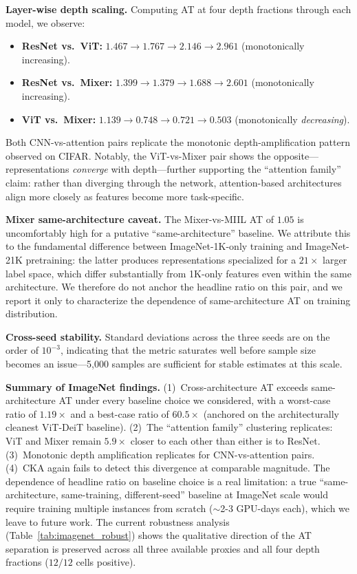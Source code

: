 \documentclass{article}
\begin{document}
\textbf{Layer-wise depth scaling.} Computing AT at four depth fractions through each model, we observe:
\begin{itemize}
    \item \textbf{ResNet vs.\ ViT:} $1.467 \to 1.767 \to 2.146 \to 2.961$ (monotonically increasing).
    \item \textbf{ResNet vs.\ Mixer:} $1.399 \to 1.379 \to 1.688 \to 2.601$ (monotonically increasing).
    \item \textbf{ViT vs.\ Mixer:} $1.139 \to 0.748 \to 0.721 \to 0.503$ (monotonically \emph{decreasing}).
\end{itemize}
Both CNN-vs-attention pairs replicate the monotonic depth-amplification pattern observed on CIFAR. Notably, the ViT-vs-Mixer pair shows the opposite---representations \emph{converge} with depth---further supporting the ``attention family'' claim: rather than diverging through the network, attention-based architectures align more closely as features become more task-specific.

\textbf{Mixer same-architecture caveat.} The Mixer-vs-MIIL AT of $1.05$ is uncomfortably high for a putative ``same-architecture'' baseline. We attribute this to the fundamental difference between ImageNet-1K-only training and ImageNet-21K pretraining: the latter produces representations specialized for a $21\times$ larger label space, which differ substantially from 1K-only features even within the same architecture. We therefore do not anchor the headline ratio on this pair, and we report it only to characterize the dependence of same-architecture AT on training distribution.

\textbf{Cross-seed stability.} Standard deviations across the three seeds are on the order of $10^{-3}$, indicating that the metric saturates well before sample size becomes an issue---5{,}000 samples are sufficient for stable estimates at this scale.

\textbf{Summary of ImageNet findings.} (1)~Cross-architecture AT exceeds same-architecture AT under every baseline choice we considered, with a worst-case ratio of $1.19\times$ and a best-case ratio of $60.5\times$ (anchored on the architecturally cleanest ViT-DeiT baseline). (2)~The ``attention family'' clustering replicates: ViT and Mixer remain $5.9\times$ closer to each other than either is to ResNet. (3)~Monotonic depth amplification replicates for CNN-vs-attention pairs. (4)~CKA again fails to detect this divergence at comparable magnitude. The dependence of headline ratio on baseline choice is a real limitation: a true ``same-architecture, same-training, different-seed'' baseline at ImageNet scale would require training multiple instances from scratch ($\sim$2-3 GPU-days each), which we leave to future work. The current robustness analysis (Table~\ref{tab:imagenet_robust}) shows the qualitative direction of the AT separation is preserved across all three available proxies and all four depth fractions ($12/12$ cells positive).
\end{document}
